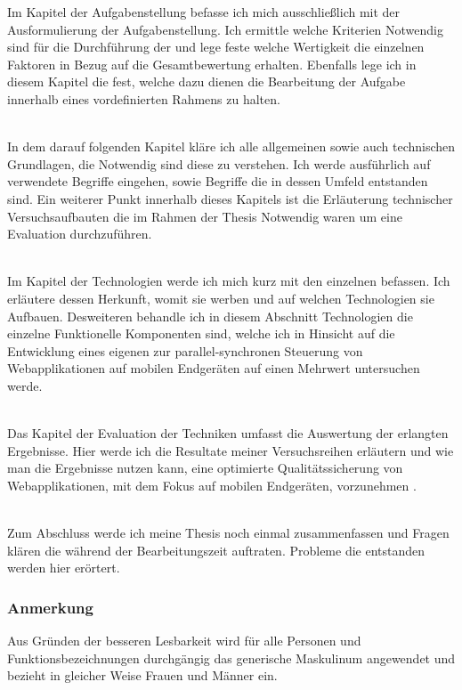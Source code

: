 \pagebreak
Im Kapitel der Aufgabenstellung befasse ich mich ausschließlich mit der Ausformulierung der Aufgabenstellung. Ich ermittle welche Kriterien Notwendig sind für die Durchführung der  und lege feste welche Wertigkeit die einzelnen Faktoren in Bezug auf die Gesamtbewertung erhalten. Ebenfalls lege ich in diesem Kapitel die  fest, welche dazu dienen die Bearbeitung der Aufgabe innerhalb eines vordefinierten Rahmens zu halten.

\\
In dem darauf folgenden Kapitel kläre ich alle allgemeinen sowie auch technischen Grundlagen, die Notwendig sind diese  zu verstehen. Ich werde ausführlich auf verwendete Begriffe eingehen, sowie Begriffe die in dessen Umfeld entstanden sind. Ein weiterer Punkt innerhalb dieses Kapitels ist die Erläuterung technischer Versuchsaufbauten die im Rahmen der Thesis Notwendig waren um eine Evaluation durchzuführen.

\\
Im Kapitel der Technologien werde ich mich kurz mit den einzelnen  befassen. Ich erläutere dessen Herkunft, womit sie werben und auf welchen Technologien sie Aufbauen. Desweiteren behandle ich in diesem Abschnitt Technologien die einzelne Funktionelle Komponenten sind, welche ich in Hinsicht auf die Entwicklung eines eigenen  zur parallel-synchronen Steuerung von Webapplikationen auf mobilen Endgeräten auf einen Mehrwert untersuchen werde.

\\
Das Kapitel der Evaluation der Techniken umfasst die Auswertung der erlangten Ergebnisse. Hier werde ich die Resultate meiner Versuchsreihen erläutern und wie man die Ergebnisse nutzen kann, eine optimierte Qualitätssicherung von Webapplikationen, mit dem Fokus auf mobilen Endgeräten, vorzunehmen .

\\
Zum Abschluss werde ich meine Thesis noch einmal zusammenfassen und Fragen klären die während der Bearbeitungszeit auftraten. Probleme die entstanden werden hier erörtert.


\subsubsection{Anmerkung}
Aus Gründen der besseren Lesbarkeit wird für alle Personen und Funktionsbezeichnungen durchgängig das generische Maskulinum angewendet und bezieht in gleicher Weise Frauen und Männer ein.